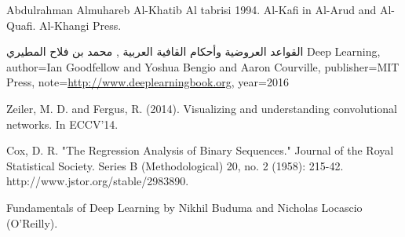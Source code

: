 \makeatletter
\renewcommand{\ps@plain}{%
\renewcommand\@oddhead{\hfil\normalfont\textrm{\thepage}}%
\renewcommand\@evenhead{}%
\renewcommand\@oddfoot{}%
\renewcommand\@evenfoot{}%
}
\makeatother
\pagestyle{myheadings}
\renewcommand\bibname{\uppercase{References}}
\begin{thebibliography}{999}
Abdulrahman Almuhareb
 Al-Khatib Al tabrisi 1994. Al-Kafi in Al-Arud and Al-Quafi. Al-Khangi Press.
 

    
 القواعد العروضية وأحكام القافية العربية , محمد بن فلاح المطيري
 Deep Learning,
    author={Ian Goodfellow and Yoshua Bengio and Aaron Courville},
    publisher={MIT Press},
    note={\url{http://www.deeplearningbook.org}},
    year={2016}

     Zeiler, M. D. and Fergus, R. (2014). Visualizing and understanding convolutional networks. In ECCV’14.

       Cox, D. R. "The Regression Analysis of Binary Sequences." Journal of the Royal Statistical Society. Series B (Methodological) 20, no. 2 (1958): 215-42. http://www.jstor.org/stable/2983890.

Fundamentals of Deep Learning by Nikhil Buduma and Nicholas Locascio (O’Reilly).

\end{thebibliography}


%
%
%
%
\newpage
